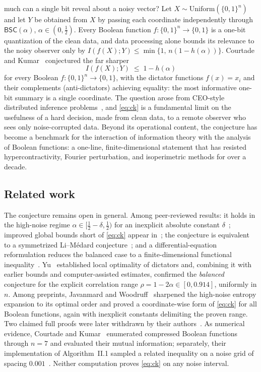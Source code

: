 \documentclass[12pt,draftclsnofoot,onecolumn,journal]{IEEEtran}
\newcommand{\BSC}{\mathsf{BSC}}
\begin{document}
 much can a single bit reveal about a noisy vector? Let
$X\sim\mathrm{Uniform}(\{0,1\}^n)$ and let $Y$ be obtained from $X$ by
passing each coordinate independently through $\BSC(\alpha)$,
$\alpha\in(0,\tfrac12)$. Every Boolean function $f:\{0,1\}^n\to\{0,1\}$ is a
one-bit quantization of the clean data, and data processing alone bounds its
relevance to the noisy observer only by
$I(f(X);Y)\le\min\{1,\,n(1-h(\alpha))\}$. Courtade and Kumar~\cite{CK14}
conjectured the far sharper
\begin{equation}\label{eq:ck}
I(f(X);Y)\;\le\;1-h(\alpha)
\end{equation}
for every Boolean $f:\{0,1\}^n\to\{0,1\}$, with the dictator functions
$f(x)=x_i$ and their complements (anti-dictators) achieving equality: the most
informative one-bit summary is a single coordinate. The question arose from
CEO-style distributed inference problems~\cite{CK14}, and \eqref{eq:ck} is a
fundamental limit on the usefulness of a hard decision, made from clean data,
to a remote observer who sees only noise-corrupted data. Beyond its
operational content, the conjecture has become a benchmark for the interaction
of information theory with the analysis of Boolean functions: a one-line,
finite-dimensional statement that has resisted hypercontractivity, Fourier
perturbation, and isoperimetric methods for over a decade.

\subsection{Related work}

The conjecture remains open in general. Among peer-reviewed results: it holds
in the high-noise regime $\alpha\in[\tfrac12-\delta,\tfrac12)$ for an
inexplicit absolute constant $\delta$~\cite{Samorodnitsky16}; improved global
bounds short of \eqref{eq:ck} appear in~\cite{OSW16}; the conjecture is
equivalent to a symmetrized Li--M\'edard conjecture~\cite{BO20}; and a
differential-equation reformulation reduces the balanced case to a
finite-dimensional functional inequality~\cite{CGN25}. Yu~\cite{Yu24}
established local optimality of dictators and, combining it with earlier
bounds and computer-assisted estimates, confirmed the \emph{balanced}
conjecture for the explicit correlation range $\rho=1-2\alpha\in[0,0.914]$,
uniformly in $n$. Among preprints, Javanmard and Woodruff~\cite{JW26}
sharpened the high-noise entropy expansion to its optimal order and proved a
coordinate-wise form of \eqref{eq:ck} for all Boolean functions, again with
inexplicit constants delimiting the proven range. Two claimed full proofs
were later withdrawn by their authors~\cite{Kesal15,Sarbu16}. As numerical
evidence, Courtade and Kumar~\cite[Sec.~II-B]{CK14} enumerated compressed
Boolean functions through $n=7$ and evaluated their mutual information;
separately, their implementation of Algorithm~II.1 sampled a related
inequality on a noise grid of spacing $0.001$~\cite[Sec.~II-D]{CK14}. Neither
computation proves \eqref{eq:ck} on any noise interval.
\end{document}
